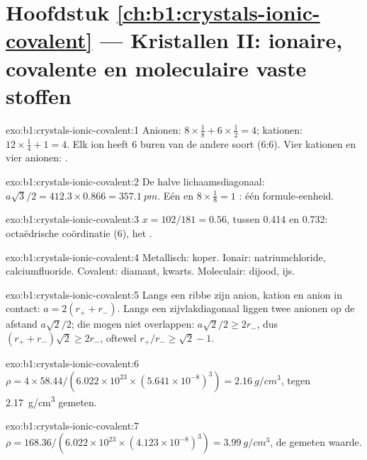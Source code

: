 \section*{Hoofdstuk \ref{ch:b1:crystals-ionic-covalent} --- Kristallen II: ionaire, covalente en moleculaire vaste stoffen}

\begin{solution}{exo:b1:crystals-ionic-covalent:1}
Anionen: $8 \times \frac18 + 6 \times \frac12 = 4$; kationen: $12 \times
\frac14 + 1 = 4$. Elk ion heeft 6 buren van de andere soort (6:6). Vier
kationen en vier anionen: .
\end{solution}

\begin{solution}{exo:b1:crystals-ionic-covalent:2}
De halve lichaamsdiagonaal: $a\sqrt3/2 = 412.3 \times 0.866 = \qty{357.1}{pm}$.
Eén  en $8 \times \frac18 = 1$ : één formule-eenheid.
\end{solution}

\begin{solution}{exo:b1:crystals-ionic-covalent:3}
$x = 102/181 = 0.56$, tussen 0.414 en 0.732: octaëdrische coördinatie
(6), het .
\end{solution}

\begin{solution}{exo:b1:crystals-ionic-covalent:4}
Metallisch: koper. Ionair: natriumchloride, calciumfluoride. Covalent:
diamant, kwarts. Moleculair: dijood, ijs.
\end{solution}

\begin{solution}{exo:b1:crystals-ionic-covalent:5}
Langs een ribbe zijn anion, kation en anion in contact: $a = 2(r_+ + r_-)$.
Langs een zijvlakdiagonaal liggen twee anionen op de afstand
$a\sqrt2/2$; die mogen niet overlappen: $a\sqrt2/2 \ge 2r_-$, dus
$(r_+ + r_-)\sqrt2 \ge 2r_-$, oftewel
$r_+/r_- \ge \sqrt2 - 1$.
\end{solution}

\begin{solution}{exo:b1:crystals-ionic-covalent:6}
$\rho = 4 \times 58.44/(6.022 \times 10^{23} \times (5.641 \times
10^{-8})^3) = \qty{2.16}{g/cm^3}$, tegen \qty{2.17}{g/cm^3} gemeten.
\end{solution}

\begin{solution}{exo:b1:crystals-ionic-covalent:7}
$\rho = 168.36/(6.022 \times 10^{23} \times (4.123 \times 10^{-8})^3) =
\qty{3.99}{g/cm^3}$, de gemeten waarde.
\end{solution}

